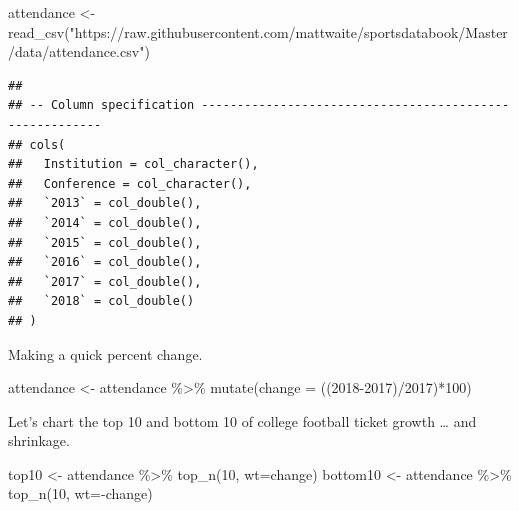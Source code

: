 \documentclass[
]{book}
\newenvironment{Shaded}{\begin{snugshade}}{\end{snugshade}}
\newcommand{\AttributeTok}[1]{\textcolor[rgb]{0.77,0.63,0.00}{#1}}
\newcommand{\DecValTok}[1]{\textcolor[rgb]{0.00,0.00,0.81}{#1}}
\newcommand{\FunctionTok}[1]{\textcolor[rgb]{0.00,0.00,0.00}{#1}}
\newcommand{\NormalTok}[1]{#1}
\newcommand{\OtherTok}[1]{\textcolor[rgb]{0.56,0.35,0.01}{#1}}
\newcommand{\SpecialCharTok}[1]{\textcolor[rgb]{0.00,0.00,0.00}{#1}}
\newcommand{\StringTok}[1]{\textcolor[rgb]{0.31,0.60,0.02}{#1}}
\begin{document}
\begin{Shaded}
\begin{Highlighting}[]
\NormalTok{attendance }\OtherTok{\textless{}{-}} \FunctionTok{read\_csv}\NormalTok{(}\StringTok{"https://raw.githubusercontent.com/mattwaite/sportsdatabook/Master/data/attendance.csv"}\NormalTok{)}
\end{Highlighting}
\end{Shaded}

\begin{verbatim}
## 
## -- Column specification --------------------------------------------------------
## cols(
##   Institution = col_character(),
##   Conference = col_character(),
##   `2013` = col_double(),
##   `2014` = col_double(),
##   `2015` = col_double(),
##   `2016` = col_double(),
##   `2017` = col_double(),
##   `2018` = col_double()
## )
\end{verbatim}

Making a quick percent change.

\begin{Shaded}
\begin{Highlighting}[]
\NormalTok{attendance }\OtherTok{\textless{}{-}}\NormalTok{ attendance }\SpecialCharTok{\%\textgreater{}\%} \FunctionTok{mutate}\NormalTok{(}\AttributeTok{change =}\NormalTok{ ((}\StringTok{\textasciigrave{}}\AttributeTok{2018}\StringTok{\textasciigrave{}}\SpecialCharTok{{-}}\StringTok{\textasciigrave{}}\AttributeTok{2017}\StringTok{\textasciigrave{}}\NormalTok{)}\SpecialCharTok{/}\StringTok{\textasciigrave{}}\AttributeTok{2017}\StringTok{\textasciigrave{}}\NormalTok{)}\SpecialCharTok{*}\DecValTok{100}\NormalTok{)}
\end{Highlighting}
\end{Shaded}

Let's chart the top 10 and bottom 10 of college football ticket growth \ldots{} and shrinkage.

\begin{Shaded}
\begin{Highlighting}[]
\NormalTok{top10 }\OtherTok{\textless{}{-}}\NormalTok{ attendance }\SpecialCharTok{\%\textgreater{}\%} \FunctionTok{top\_n}\NormalTok{(}\DecValTok{10}\NormalTok{, }\AttributeTok{wt=}\NormalTok{change)}
\NormalTok{bottom10 }\OtherTok{\textless{}{-}}\NormalTok{ attendance }\SpecialCharTok{\%\textgreater{}\%} \FunctionTok{top\_n}\NormalTok{(}\DecValTok{10}\NormalTok{, }\AttributeTok{wt=}\SpecialCharTok{{-}}\NormalTok{change)}
\end{Highlighting}
\end{Shaded}
\end{document}
